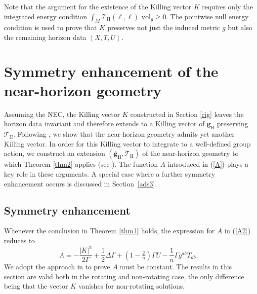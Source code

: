 \documentclass[11pt, reqno]{amsart}
\theoremstyle{plain}
\theoremstyle{definition}
\numberwithin{equation}{section}
\begin{document}
Note that the argument for the existence of the Killing vector $K$ requires only the integrated energy condition $\int_M \mathcal{T}_{\text{H}}(\ell,\ell)\text{ vol}_g \geq 0$. The pointwise null energy condition is used to prove that $K$ preserves not just the induced metric $g$ but also the remaining horizon data $(X,T,U)$. 
   
\section{Symmetry enhancement of the near-horizon geometry}  \label{enhsec}
Assuming the NEC, the Killing vector $K$ constructed in Section \ref{rig} leaves the horizon data invariant and therefore extends to a Killing vector of $\textbf{g}_{\text{H}}$ preserving $\mathcal{T}_{\text{H}}$. Following \cite{KLR, DL}, we show that the near-horizon geometry admits yet another Killing vector. In order for this Killing vector to integrate to a well-defined group action, we construct an extension $(\overline{\textbf{g}}_{\text{H}},\overline{\mathcal{T}}_{\text{H}})$ of the near-horizon geometry to which Theorem \ref{thm2} applies (see \cite[Remark 2.9]{DL}). The function $A$ introduced in (\ref{A}) plays a key role in these arguments. A special case where a further symmetry enhancement occurs is discussed in Section~\ref{ads3}. 

\subsection{Symmetry enhancement} \label{senhsec} Whenever the conclusion in Theorem \ref{thm1} holds, the expression for $A$ in (\ref{A2}) reduces to
\begin{equation} \label{Aclean}
A = -\frac{\vert K \vert^2}{2\Gamma} + \frac 12 \Delta \Gamma + (1-\tfrac 2n)\Gamma U - \frac 1n\Gamma g^{ab}T_{ab}.
\end{equation}
We adopt the approach in \cite{KL24, DL} to prove $A$ must be constant. The results in this section are valid both in the rotating and non-rotating case, the only difference being that the vector $K$ vanishes for non-rotating solutions.
\end{document}
